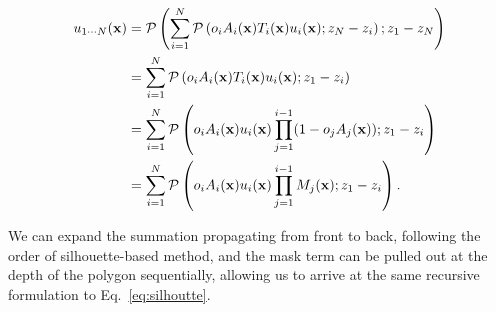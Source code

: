 \begin{align}
 u_{1 \cdots N} (\mathbf{x}) &= \mathcal{P} \left(\sum_{i=1}^{N} \mathcal{P} \left( o_i A_i(\mathbf{x}) T_i (\mathbf{x})  u_i (\mathbf{x}); z_N - z_i \right); z_1 - z_N \right) \\
 &= \sum_{i=1}^{N} \mathcal{P} \left( o_i A_i(\mathbf{x}) T_i (\mathbf{x})  u_i (\mathbf{x}); z_1 - z_i \right) \\
 &= \sum_{i=1}^{N} \mathcal{P} \left( o_i A_i(\mathbf{x}) u_i (\mathbf{x})
 \prod_{j=1}^{i-1} (1 - o_{j} A_j(\mathbf{x})) ; z_1 - z_i \right) \\
 &= \sum_{i=1}^{N} \mathcal{P} \left( o_i A_i(\mathbf{x}) u_i (\mathbf{x}) \prod_{j=1}^{i-1} M_j (\mathbf{x}); z_1 - z_i \right).
\end{align}

We can expand the summation propagating from front to back, following the order of silhouette-based method, and the mask term can be pulled out at the depth of the polygon sequentially, allowing us to arrive at the same recursive formulation to Eq.~\ref{eq:silhoutte}.


